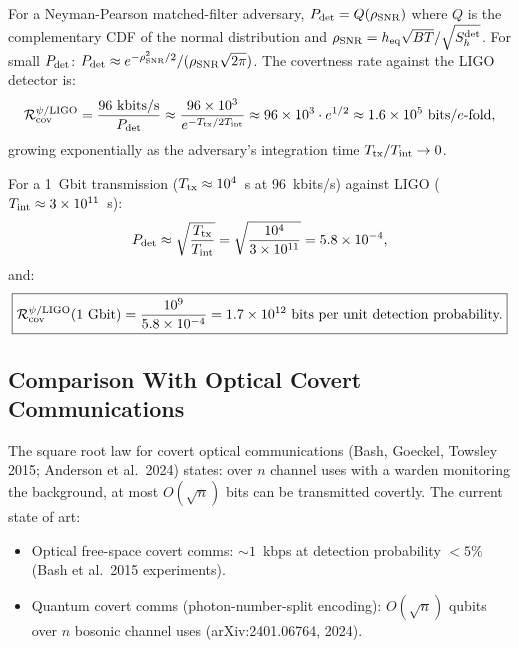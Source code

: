 \documentclass[aps,prd,twocolumn,superscriptaddress,nofootinbib]{revtex4-2}
\begin{document}
For a Neyman-Pearson matched-filter adversary, $P_{\rm det} = Q(\rho_{\rm SNR})$
where $Q$ is the complementary CDF of the normal distribution and
$\rho_{\rm SNR} = h_{\rm eq}\sqrt{BT}/\sqrt{S_h^{\rm det}}$.
For small $P_{\rm det}$: $P_{\rm det} \approx e^{-\rho_{\rm SNR}^2/2}/(\rho_{\rm SNR}\sqrt{2\pi})$.
The covertness rate against the LIGO detector is:
\begin{equation}
\mathcal{R}_{\rm cov}^{\psi/\rm LIGO} = \frac{96~\text{kbits/s}}{P_{\rm det}}
\approx \frac{96\times 10^3}{e^{-T_{\rm tx}/2T_{\rm int}}}
\approx 96\times 10^3 \cdot e^{1/2} \approx 1.6\times 10^5~\text{bits/$e$-fold},
\end{equation}
growing exponentially as the adversary's integration time $T_{\rm tx}/T_{\rm int} \to 0$.

For a 1~Gbit transmission ($T_{\rm tx} \approx 10^4$~s at 96~kbits/s)
against LIGO ($T_{\rm int} \approx 3\times 10^{11}$~s):
\begin{equation}
P_{\rm det} \approx \sqrt{\frac{T_{\rm tx}}{T_{\rm int}}} = \sqrt{\frac{10^4}{3\times 10^{11}}}
= 5.8\times 10^{-4},
\end{equation}
and:
\begin{equation}
\boxed{
\mathcal{R}_{\rm cov}^{\psi/\rm LIGO}(1~\text{Gbit}) = \frac{10^9}{5.8\times 10^{-4}}
= 1.7\times 10^{12}~\text{bits per unit detection probability.}
}
\label{eq:R-cov}
\end{equation}

\subsection{Comparison With Optical Covert Communications}

The square root law for covert optical communications (Bash, Goeckel,
Towsley 2015; Anderson et al.\ 2024) states: over $n$ channel uses with
a warden monitoring the background, at most $O(\sqrt{n})$ bits can be
transmitted covertly. The current state of art:
\begin{itemize}
\item Optical free-space covert comms: $\sim 1$~kbps at detection
probability $< 5\%$ (Bash et al.\ 2015 experiments).
\item Quantum covert comms (photon-number-split encoding):
$O(\sqrt{n})$ qubits over $n$ bosonic channel uses
(arXiv:2401.06764, 2024).
\end{itemize}
\end{document}
